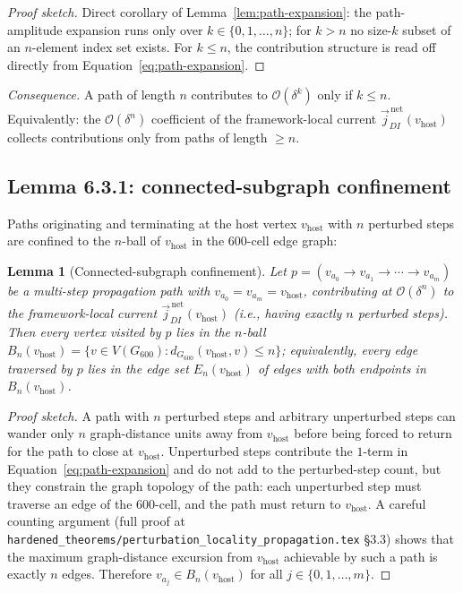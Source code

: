 \documentclass[11pt,letterpaper]{article}
\newtheorem{lemma}[theorem]{Lemma}
\newcommand{\vhost}{v_{\text{host}}}
\newcommand{\jDInet}{\vec{j}_{DI}^{\,\text{net}}}
\newcommand{\bigO}[1]{\mathcal{O}(#1)}
\begin{document}
\begin{proof}[Proof sketch]
Direct corollary of Lemma~\ref{lem:path-expansion}: the path-amplitude expansion runs only over $k \in \{0, 1, \ldots, n\}$; for $k > n$ no size-$k$ subset of an $n$-element index set exists. For $k \le n$, the contribution structure is read off directly from Equation~\eqref{eq:path-expansion}.
\end{proof}

\emph{Consequence.} A path of length $n$ contributes to $\bigO{\delta^k}$ only if $k \le n$. Equivalently: the $\bigO{\delta^n}$ coefficient of the framework-local current $\jDInet(\vhost)$ collects contributions only from paths of length $\ge n$.

\subsection{Lemma 6.3.1: connected-subgraph confinement}
\label{sec:connected-subgraph-confinement}

Paths originating and terminating at the host vertex $\vhost$ with $n$ perturbed steps are confined to the $n$-ball of $\vhost$ in the 600-cell edge graph:

\begin{lemma}[Connected-subgraph confinement]
\label{lem:subgraph-confinement}
Let $p = (v_{a_0} \to v_{a_1} \to \cdots \to v_{a_m})$ be a multi-step propagation path with $v_{a_0} = v_{a_m} = \vhost$, contributing at $\bigO{\delta^n}$ to the framework-local current $\jDInet(\vhost)$ (i.e., having exactly $n$ perturbed steps). Then every vertex visited by $p$ lies in the $n$-ball $B_n(\vhost) = \{ v \in V(G_{600}) : d_{G_{600}}(\vhost, v) \le n \}$; equivalently, every edge traversed by $p$ lies in the edge set $E_n(\vhost)$ of edges with both endpoints in $B_n(\vhost)$.
\end{lemma}

\begin{proof}[Proof sketch]
A path with $n$ perturbed steps and arbitrary unperturbed steps can wander only $n$ graph-distance units away from $\vhost$ before being forced to return for the path to close at $\vhost$. Unperturbed steps contribute the $1$-term in Equation~\eqref{eq:path-expansion} and do not add to the perturbed-step count, but they constrain the graph topology of the path: each unperturbed step must traverse an edge of the 600-cell, and the path must return to $\vhost$. A careful counting argument (full proof at \texttt{hardened\_theorems/perturbation\_locality\_propagation.tex} \S3.3) shows that the maximum graph-distance excursion from $\vhost$ achievable by such a path is exactly $n$ edges. Therefore $v_{a_j} \in B_n(\vhost)$ for all $j \in \{0, 1, \ldots, m\}$.
\end{proof}
\end{document}
